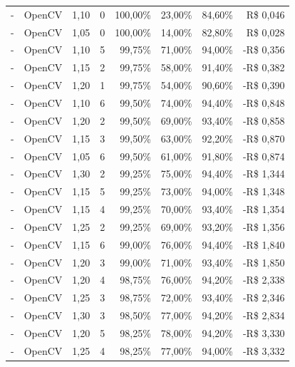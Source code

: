 \begin{table}[htbp]
\begin{tabular}{clrrrrrr}
        -     & OpenCV & 1,10 & 0  & 100,00\%      & 23,00\%        & 84,60\%  & R\$ 0,046  \\
        -     & OpenCV & 1,05 & 0  & 100,00\%      & 14,00\%        & 82,80\%  & R\$ 0,028  \\
        -     & OpenCV & 1,10 & 5  & 99,75\%       & 71,00\%        & 94,00\%  & -R\$ 0,356 \\
        -     & OpenCV & 1,15 & 2  & 99,75\%       & 58,00\%        & 91,40\%  & -R\$ 0,382 \\
        -     & OpenCV & 1,20 & 1  & 99,75\%       & 54,00\%        & 90,60\%  & -R\$ 0,390 \\
        -     & OpenCV & 1,10 & 6  & 99,50\%       & 74,00\%        & 94,40\%  & -R\$ 0,848 \\
        -     & OpenCV & 1,20 & 2  & 99,50\%       & 69,00\%        & 93,40\%  & -R\$ 0,858 \\
        -     & OpenCV & 1,15 & 3  & 99,50\%       & 63,00\%        & 92,20\%  & -R\$ 0,870 \\
        -     & OpenCV & 1,05 & 6  & 99,50\%       & 61,00\%        & 91,80\%  & -R\$ 0,874 \\
        -     & OpenCV & 1,30 & 2  & 99,25\%       & 75,00\%        & 94,40\%  & -R\$ 1,344 \\
        -     & OpenCV & 1,15 & 5  & 99,25\%       & 73,00\%        & 94,00\%  & -R\$ 1,348 \\
        -     & OpenCV & 1,15 & 4  & 99,25\%       & 70,00\%        & 93,40\%  & -R\$ 1,354 \\
        -     & OpenCV & 1,25 & 2  & 99,25\%       & 69,00\%        & 93,20\%  & -R\$ 1,356 \\
        -     & OpenCV & 1,15 & 6  & 99,00\%       & 76,00\%        & 94,40\%  & -R\$ 1,840 \\
        -     & OpenCV & 1,20 & 3  & 99,00\%       & 71,00\%        & 93,40\%  & -R\$ 1,850 \\
        -     & OpenCV & 1,20 & 4  & 98,75\%       & 76,00\%        & 94,20\%  & -R\$ 2,338 \\
        -     & OpenCV & 1,25 & 3  & 98,75\%       & 72,00\%        & 93,40\%  & -R\$ 2,346 \\
        -     & OpenCV & 1,30 & 3  & 98,50\%       & 77,00\%        & 94,20\%  & -R\$ 2,834 \\
        -     & OpenCV & 1,20 & 5  & 98,25\%       & 78,00\%        & 94,20\%  & -R\$ 3,330 \\
        -     & OpenCV & 1,25 & 4  & 98,25\%       & 77,00\%        & 94,00\%  & -R\$ 3,332 \\

\end{tabular}
\end{table}
